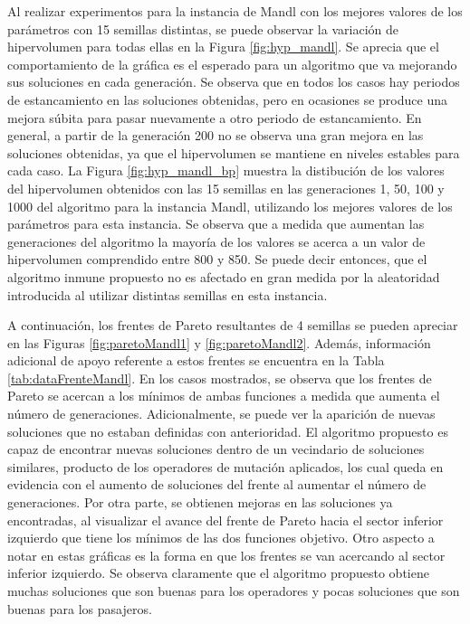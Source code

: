 Al realizar experimentos para la instancia de Mandl con los mejores valores de los parámetros con 15 semillas distintas, se puede observar la variación de hipervolumen para todas ellas en la Figura \ref{fig:hyp_mandl}. Se aprecia que el comportamiento de la gráfica es el esperado para un algoritmo que va mejorando sus soluciones en cada generación. Se observa que en todos los casos hay periodos de estancamiento en las soluciones obtenidas, pero en ocasiones se produce una mejora súbita para pasar nuevamente a otro periodo de estancamiento. En general, a partir de la generación 200 no se observa una gran mejora en las soluciones obtenidas, ya que el hipervolumen se mantiene en niveles estables para cada caso. La Figura \ref{fig:hyp_mandl_bp} muestra la distibución de los valores del hipervolumen obtenidos con las 15 semillas en las generaciones 1, 50, 100 y 1000 del algoritmo para la instancia Mandl, utilizando los mejores valores de los parámetros para esta instancia. Se observa que a medida que aumentan las generaciones del algoritmo la mayoría de los valores se acerca a un valor de hipervolumen comprendido entre 800 y 850. Se puede decir entonces, que el algoritmo inmune propuesto no es afectado en gran medida por la aleatoridad introducida al utilizar distintas semillas en esta instancia.

A continuación, los frentes de Pareto resultantes de 4 semillas se pueden apreciar en las Figuras \ref{fig:paretoMandl1} y \ref{fig:paretoMandl2}. Además, información adicional de apoyo referente a estos frentes se encuentra en la Tabla \ref{tab:dataFrenteMandl}. En los casos mostrados, se observa que los frentes de Pareto se acercan a los mínimos de ambas funciones a medida que aumenta el número de generaciones. Adicionalmente, se puede ver la aparición de nuevas soluciones que no estaban definidas con anterioridad. El algoritmo propuesto es capaz de encontrar nuevas soluciones dentro de un vecindario de soluciones similares, producto de los operadores de mutación aplicados, los cual queda en evidencia con el aumento de soluciones del frente al aumentar el número de generaciones. Por otra parte, se obtienen mejoras en las soluciones ya encontradas, al visualizar el avance del frente de Pareto hacia el sector inferior izquierdo que tiene los mínimos de las dos funciones objetivo. Otro aspecto a notar en estas gráficas es la forma en que los frentes se van acercando al sector inferior izquierdo. Se observa claramente que el algoritmo propuesto obtiene muchas soluciones que son buenas para los operadores y pocas soluciones que son buenas para los pasajeros. 

